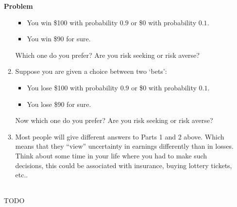 \documentclass[12pt]{article}
\newenvironment{Ex}{\textbf{Problem}\vspace{.75em}\\}{}
\begin{document}
\begin{enumerate}
\begin{Ex}
\begin{enumerate}
        \begin{itemize}
        \item You win \$100 with probability $0.9$ or \$0 with
          probability $0.1$.
        \item You win \$90 for sure.
        \end{itemize}
        Which one do you prefer? Are you risk
        seeking or risk averse? 
      \item Suppose you are given a choice
        between two `bets':
        \begin{itemize}
        \item You lose \$100 with probability $0.9$ or \$0 with
          probability $0.1$.
        \item You lose \$90 for sure.
        \end{itemize}
        Now which one do you prefer? Are you risk seeking or risk averse?
      \item Most people will give different answers to Parts 1 and 2
        above. Which means that they ``view'' uncertainty in earnings
        differently than in losses. Think about some time in your life
        where you had to make such decisions, this could be associated
        with insurance, buying lottery tickets, etc..
      \end{enumerate}
      \begin{solution} \hfill \\
        {\huge TODO}
      \end{solution}
    \end{Ex}
  \end{enumerate}
\end{document}
